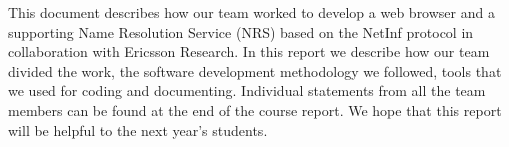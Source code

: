This document describes how our team worked to develop a web browser and a supporting
Name Resolution Service (NRS) based on the NetInf protocol in collaboration with Ericsson Research. 
In this report we describe how our team divided the work, the software development methodology we followed, 
tools that we used for coding and documenting. Individual statements from all the team members can be
found at the end of the course report. We hope that this report will be helpful to the next year's students.
